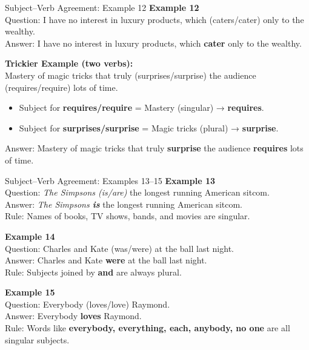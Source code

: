\documentclass[aspectratio=169,11pt]{beamer}
\begin{document}
\begin{frame}{Subject–Verb Agreement: Example 12}
\small
\textbf{Example 12} \\
Question: I have no interest in luxury products, which (caters/cater) only to the wealthy. \\
Answer: I have no interest in luxury products, which \textbf{cater} only to the wealthy.  

\vspace{0.8em}
\textbf{Trickier Example (two verbs):} \\
Mastery of magic tricks that truly (surprises/surprise) the audience (requires/require) lots of time.  

\begin{itemize}
  \item Subject for \textbf{requires/require} = Mastery (singular) → \textbf{requires}.  
  \item Subject for \textbf{surprises/surprise} = Magic tricks (plural) → \textbf{surprise}.
\end{itemize}

Answer: Mastery of magic tricks that truly \textbf{surprise} the audience \textbf{requires} lots of time.
\end{frame}

\begin{frame}{Subject–Verb Agreement: Examples 13–15}
\small
\textbf{Example 13} \\
Question: \textit{The Simpsons (is/are)} the longest running American sitcom. \\
Answer: \textit{The Simpsons \textbf{is}} the longest running American sitcom. \\
Rule: Names of books, TV shows, bands, and movies are singular.

\vspace{0.7em}
\textbf{Example 14} \\
Question: Charles and Kate (was/were) at the ball last night. \\
Answer: Charles and Kate \textbf{were} at the ball last night. \\
Rule: Subjects joined by \textbf{and} are always plural.

\vspace{0.7em}
\textbf{Example 15} \\
Question: Everybody (loves/love) Raymond. \\
Answer: Everybody \textbf{loves} Raymond. \\
Rule: Words like \textbf{everybody, everything, each, anybody, no one} are all singular subjects.
\end{frame}
\end{document}
